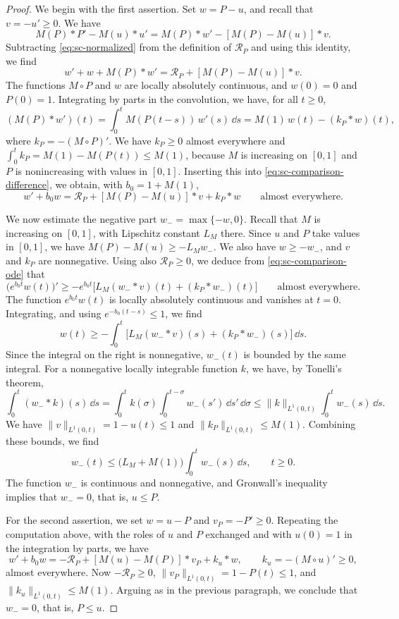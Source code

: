 \begin{proof}
We begin with the first assertion. Set $w=P-u$, and recall that $v=-u'\ge0$. We have
\[
 M(P)*P'-M(u)*u'=M(P)*w'-[M(P)-M(u)]*v .
\]
Subtracting \eqref{eq:sc-normalized} from the definition of $\mathcal R_P$ and using this identity, we find
\begin{equation}\label{eq:sc-comparison-difference}
 w'+w+M(P)*w'=\mathcal R_P+[M(P)-M(u)]*v .
\end{equation}
The functions $M\circ P$ and $w$ are locally absolutely continuous, and $w(0)=0$ and $P(0)=1$. Integrating by parts in the convolution, we have, for all $t\ge0$,
\[
 (M(P)*w')(t)=\int_0^tM(P(t-s))\,w'(s)\,\dd s=M(1)\,w(t)-(k_P*w)(t),
\]
where $k_P=-(M\circ P)'$.
We have $k_P\ge0$ almost everywhere and $\int_0^tk_P=M(1)-M(P(t))\le M(1)$, because $M$ is increasing on $[0,1]$ and $P$ is nonincreasing with values in $[0,1]$. Inserting this into \eqref{eq:sc-comparison-difference}, we obtain, with $b_0=1+M(1)$,
\begin{equation}\label{eq:sc-comparison-ode}
 w'+b_0w=\mathcal R_P+[M(P)-M(u)]*v+k_P*w\qquad\text{almost everywhere.}
\end{equation}

We now estimate the negative part $w_-=\max\{-w,0\}$. Recall that $M$ is increasing on $[0,1]$, with Lipschitz constant $L_M$ there. Since $u$ and $P$ take values in $[0,1]$, we have $M(P)-M(u)\ge-L_Mw_-$. We also have $w\ge-w_-$, and $v$ and $k_P$ are nonnegative. Using also $\mathcal R_P\ge0$, we deduce from \eqref{eq:sc-comparison-ode} that
\[
 \bigl(e^{b_0t}w(t)\bigr)'\ge-e^{b_0t}\bigl[L_M(w_-*v)(t)+(k_P*w_-)(t)\bigr]
 \qquad\text{almost everywhere.}
\]
The function $e^{b_0t}w(t)$ is locally absolutely continuous and vanishes at $t=0$. Integrating, and using $e^{-b_0(t-s)}\le1$, we find
\[
 w(t)\ge-\int_0^t\bigl[L_M(w_-*v)(s)+(k_P*w_-)(s)\bigr]\,\dd s .
\]
Since the integral on the right is nonnegative, $w_-(t)$ is bounded by the same integral. For a nonnegative locally integrable function $k$, we have, by Tonelli's theorem,
\[
 \int_0^t(w_-*k)(s)\,\dd s=\int_0^tk(\sigma)\int_0^{t-\sigma}w_-(s')\,\dd s'\,\dd\sigma
 \le\|k\|_{L^1(0,t)}\int_0^tw_-(s)\,\dd s .
\]
We have $\|v\|_{L^1(0,t)}=1-u(t)\le1$ and $\|k_P\|_{L^1(0,t)}\le M(1)$. Combining these bounds, we find
\[
 w_-(t)\le\bigl(L_M+M(1)\bigr)\int_0^tw_-(s)\,\dd s,\qquad t\ge0 .
\]
The function $w_-$ is continuous and nonnegative, and Gronwall's inequality implies that $w_-=0$, that is, $u\le P$.

For the second assertion, we set $w=u-P$ and $v_P=-P'\ge0$. Repeating the computation above, with the roles of $u$ and $P$ exchanged and with $u(0)=1$ in the integration by parts, we have
\[
 w'+b_0w=-\mathcal R_P+[M(u)-M(P)]*v_P+k_u*w,\qquad k_u=-(M\circ u)'\ge0,
\]
almost everywhere. Now $-\mathcal R_P\ge0$, $\|v_P\|_{L^1(0,t)}=1-P(t)\le1$, and $\|k_u\|_{L^1(0,t)}\le M(1)$. Arguing as in the previous paragraph, we conclude that $w_-=0$, that is, $P\le u$.
\end{proof}

